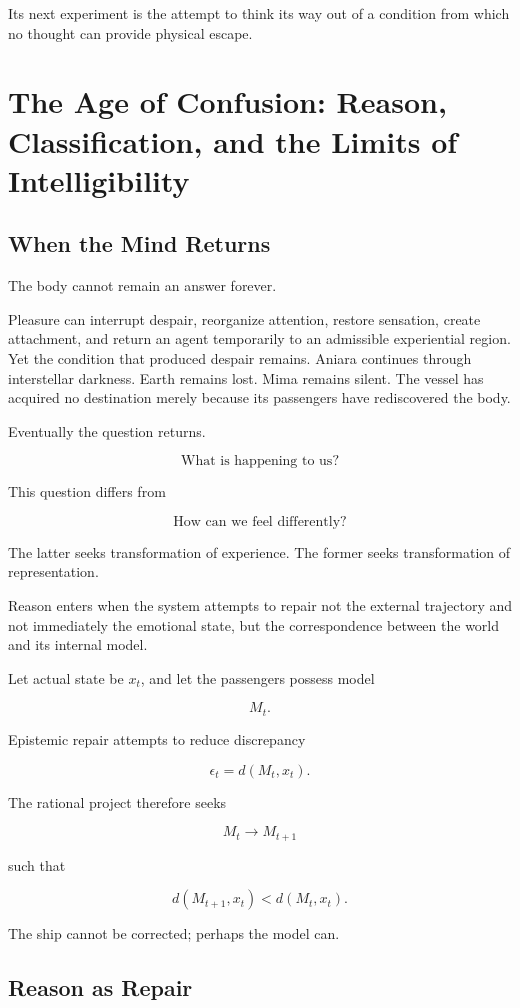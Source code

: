 \documentclass[11pt,oneside]{book}
\theoremstyle{definition}
\theoremstyle{remark}
\begin{document}
Its next experiment is the attempt to think its way out of a condition from which no thought can provide physical escape.

\chapter{The Age of Confusion: Reason, Classification, and the Limits of Intelligibility}

\section{When the Mind Returns}

The body cannot remain an answer forever.

Pleasure can interrupt despair, reorganize attention, restore sensation, create attachment, and return an agent temporarily to an admissible experiential region. Yet the condition that produced despair remains. Aniara continues through interstellar darkness. Earth remains lost. Mima remains silent. The vessel has acquired no destination merely because its passengers have rediscovered the body.

Eventually the question returns.

\[
\text{What is happening to us?}
\]

This question differs from

\[
\text{How can we feel differently?}
\]

The latter seeks transformation of experience. The former seeks transformation of representation.

Reason enters when the system attempts to repair not the external trajectory and not immediately the emotional state, but the correspondence between the world and its internal model.

Let actual state be \(x_t\), and let the passengers possess model

\[
M_t.
\]

Epistemic repair attempts to reduce discrepancy

\[
\epsilon_t
=
d(M_t,x_t).
\]

The rational project therefore seeks

\[
M_t\rightarrow M_{t+1}
\]

such that

\[
d(M_{t+1},x_t)
<
d(M_t,x_t).
\]

The ship cannot be corrected; perhaps the model can.

\section{Reason as Repair}
\end{document}

